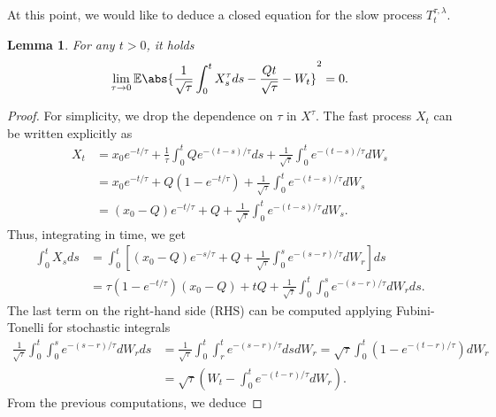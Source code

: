 \documentclass[10pt]{amsart}
\newtheorem{lemma}[theorem]{Lemma}
\numberwithin{equation}{section}
\begin{document}
At this point, we would like to deduce a closed equation for the slow process $T_t^{\tau,\lambda}$.
\begin{lemma}
For any $t>0$, it holds
$$
   \lim_{\tau \to 0} \mathbb{E} \abs{\frac{1}{\sqrt{\tau}} \int_0^t X^\tau_s ds - \frac{Qt}{\sqrt{\tau}} - W_t }^2  =   0.
$$
\label{lemma: approssimazione per tau piccolo Q}
\end{lemma}
\begin{proof}
For simplicity, we drop the dependence on $\tau$ in $X^\tau$. The fast process $X_t$ can be written explicitly as
    \begin{equation*}
        \begin{split}
                X_t &= x_0 e^{-t/\tau}+ \frac{1}{\tau} \int_0^t Qe^{-(t-s)/\tau} ds + \frac{1}{\sqrt{\tau}} \int_0^t e^{-(t-s)/\tau }dW_s \\
                & = x_0 e^{-t/\tau} + Q \left( 1-e^{-t/\tau} \right) + \frac{1}{\sqrt{\tau}} \int_0^t e^{-(t-s)/\tau }dW_s \\
                & = \left( x_0 - Q \right)e^{-t/\tau} + Q + \frac{1}{\sqrt{\tau}} \int_0^t e^{-(t-s)/\tau } dW_s.
        \end{split}
    \end{equation*}
    Thus, integrating in time, we get
    \begin{equation*}
        \begin{split}
            \int_0^t X_s ds &= \int_0^t   \left[\left( x_0 - Q \right)e^{-s/\tau} + Q + \frac{1}{\sqrt{\tau}} \int_0^s e^{-(s-r)/\tau } dW_r \right] ds \\
            & =  \tau \left( 1-e^{-t/\tau } \right)\left( x_0 - Q \right) + t Q + \frac{1}{\sqrt{\tau}} \int_0^t \int_0^s e^{-(s-r)/\tau } dW_r  ds.
        \end{split}
    \end{equation*}
    The last term on the right-hand side (RHS) can be computed applying Fubini-Tonelli for stochastic integrals
    \begin{equation*}
        \begin{split}
             \frac{1}{\sqrt{\tau}} \int_0^t \int_0^s e^{-(s-r)/\tau } dW_r  ds &=  \frac{1}{\sqrt{\tau}} \int_0^t \int_r^t e^{-(s-r)/\tau } ds dW_r   = \sqrt{\tau}  \int_0^t \left(1-e^{-(t-r)/\tau}  \right) dW_r \\
            & = \sqrt{ \tau} \left( W_t - \int_0^t e^{-(t-r)/\tau} dW_r \right).
        \end{split}
    \end{equation*}
    From the previous computations, we deduce

\end{proof}
\end{document}
